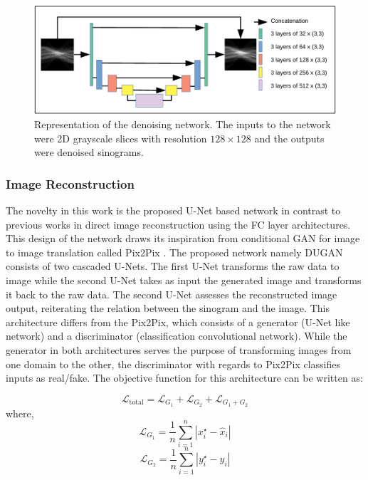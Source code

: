 \begin{figure}[!htbp]
	\centering
	\includegraphics[width=1.0\linewidth]{./Figures/denoise-crop.pdf}
	\caption{Representation of the denoising network. The inputs to the network were \ac{2D} grayscale slices with resolution $128\times{}128$ and the outputs were denoised sinograms.}
	\label{fig:denoise_nn}
\end{figure}


\subsubsection{ Image Reconstruction }
The novelty in this work is the proposed U-Net based network in contrast to previous works in direct image reconstruction using the \ac{FC} layer architectures. This design of the network draws its inspiration from conditional \ac{GAN} for image to image translation called Pix2Pix \cite{isola2017image}. The proposed network namely \ac{DUGAN} consists of two cascaded U-Nets. The first U-Net transforms the raw data to image while the second U-Net takes as input the generated image and transforms it back to the raw data. The second U-Net assesses the reconstructed image output, reiterating the relation between the sinogram and the image. This architecture differs from the Pix2Pix, which consists of a generator (U-Net like network) and a discriminator (classification convolutional network). While the generator in both architectures serves the purpose of transforming images from one domain to the other, the discriminator with regards to Pix2Pix classifies inputs as real/fake. 
The objective function for this architecture can be written as:

\begin{equation}
\mathcal{L}_\mathrm{total} = \mathcal{L}_{G_{1}} + \mathcal{L}_{G_{2}} + \mathcal{L}_{G_{1}+G_{2}}
\end{equation}
where, 
\begin{equation}
\mathcal{L}_{G_{1}} = \frac{1}{n}   \sum_{i=1}^{n} |x^\star_i - \hat{x}_i|
\end{equation}
\begin{equation}
\mathcal{L}_{G_{2}} = \frac{1}{n}   \sum_{i=1}^{n} |y^\star_i - \hat{y}_i|
\end{equation}

